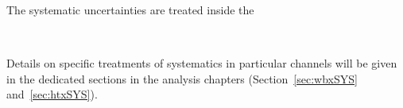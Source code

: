 The systematic uncertainties are treated inside the 


~\cite{Heinrich:7587,Junk:8128,Junk:7904}

Details on specific treatments of systematics in particular channels will
be given in the dedicated sections in the analysis chapters (Section~\ref{sec:wbxSYS} 
and~\ref{sec:htxSYS}).















%
%
